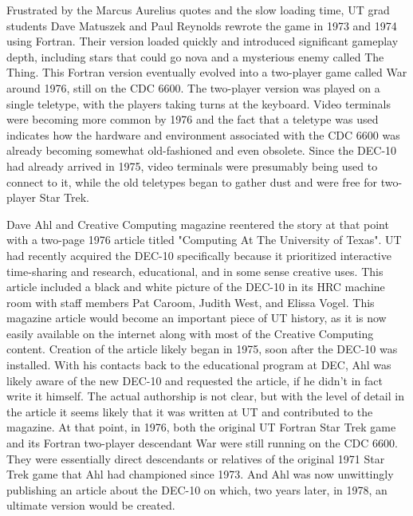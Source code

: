 Frustrated by the Marcus Aurelius quotes and the slow loading time, UT grad students Dave Matuszek and Paul Reynolds rewrote the game in 1973 and 1974 using Fortran. Their version loaded quickly and introduced significant gameplay depth, including stars that could go nova and a mysterious enemy called The Thing. This Fortran version eventually evolved into a two-player game called War around 1976, still on the CDC 6600. The two-player version was played on a single teletype, with the players taking turns at the keyboard. Video terminals were becoming more common by 1976 and the fact that a teletype was used indicates how the hardware and environment associated with the CDC 6600 was already becoming somewhat old-fashioned and even obsolete. Since the DEC-10 had already arrived in 1975, video terminals were presumably being used to connect to it, while the old teletypes began to gather dust and were free for two-player Star Trek.

Dave Ahl and Creative Computing  magazine reentered the story at that point with a two-page 1976 article titled "Computing At The University of Texas". UT had recently acquired the DEC-10 specifically because it prioritized interactive time-sharing and research, educational, and in some sense creative uses. This article included a black and white picture of the DEC-10 in its HRC machine room with staff members Pat Caroom, Judith West, and Elissa Vogel. This magazine article would become an important piece of UT history, as it is now easily available on the internet along with most of the Creative Computing content. Creation of the article likely began in 1975, soon after the DEC-10 was installed. With his contacts back to the educational program at DEC, Ahl was likely aware of the new DEC-10 and requested the article, if he didn’t in fact write it himself. The actual authorship is not clear, but with the level of detail in the article it seems likely that it was written at UT and contributed to the magazine. At that point, in 1976, both the original UT Fortran Star Trek game and its Fortran two-player descendant War were still running on the CDC 6600. They were essentially direct descendants or relatives of the original 1971 Star Trek game that Ahl had championed since 1973. And Ahl was now unwittingly publishing an article about the DEC-10 on which, two years later, in 1978, an ultimate version would be created.

